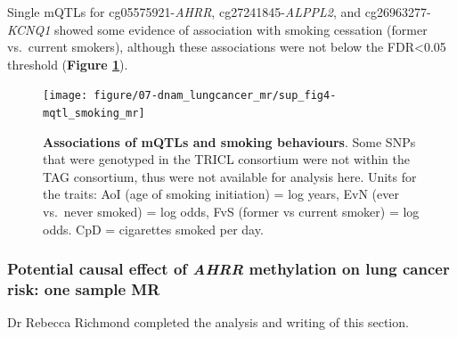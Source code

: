 \documentclass[11pt,oneside]{bristolthesis}
\begin{document}
Single mQTLs for cg05575921-\emph{AHRR}, cg27241845-\emph{ALPPL2}, and cg26963277-\emph{KCNQ1} showed some evidence of association with smoking cessation (former vs.~current smokers), although these associations were not below the FDR\textless0.05 threshold (\textbf{Figure \ref{fig:sup-fig4-07}}).




\begin{figure}

{\centering \texttt{[image: figure/07-dnam\_lungcancer\_mr/sup\_fig4-mqtl\_smoking\_mr]} 

}

\caption[Associations of mQTLs and smoking behaviours]{\textbf{Associations of mQTLs and smoking behaviours}. Some SNPs that were genotyped in the TRICL consortium were not within the TAG consortium, thus were not available for analysis here. Units for the traits: AoI (age of smoking initiation) = log years, EvN (ever vs.~never smoked) = log odds, FvS (former vs current smoker) = log odds. CpD = cigarettes smoked per day.}\label{fig:sup-fig4-07}
\end{figure}
\hypertarget{ahrr-one-sample-mr}{%
\subsubsection{\texorpdfstring{Potential causal effect of \emph{AHRR} methylation on lung cancer risk: one sample MR}{Potential causal effect of AHRR methylation on lung cancer risk: one sample MR}}\label{ahrr-one-sample-mr}}

Dr Rebecca Richmond completed the analysis and writing of this section.
\end{document}
